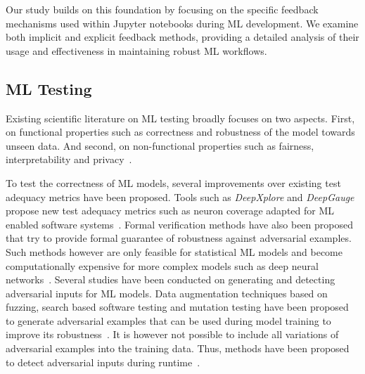 \documentclass[smallextended]{svjour3}       %
\begin{document}
Our study builds on this foundation by focusing on the specific feedback mechanisms used within Jupyter notebooks during ML development. We examine both implicit and explicit feedback methods, providing a detailed analysis of their usage and effectiveness in maintaining robust ML workflows.

\subsection{ML Testing}\label{sec:ml-testing}

Existing scientific literature on ML testing broadly focuses on two aspects. First, on functional properties such as correctness and robustness of the model towards unseen data. And second, on non-functional properties such as fairness, interpretability and privacy~\citep{zhang2022machine,mehrabi2021survey,chen2022fairness}.

To test the correctness of ML models, several improvements over existing test adequacy metrics have been proposed. Tools such as \textit{DeepXplore} and \textit{DeepGauge} propose new test adequacy metrics such as neuron coverage adapted for ML enabled software systems~\citep{pei2017deepxplore,ma2018deepgauge,gerasimou2020importance-driven}. Formal verification methods have also been proposed that try to provide formal guarantee of robustness against adversarial examples. Such methods however are only feasible for statistical ML models and become computationally expensive for more complex models such as deep neural networks~\citep{zhu2021deepmemory,baluta2021scalable}. Several studies have been conducted on generating and detecting adversarial inputs for ML models. Data augmentation techniques based on fuzzing, search based software testing and mutation testing have been proposed to generate adversarial examples that can be used during model training to improve its robustness~\citep{braiek2019deepevolution,gao2020fuzz,wang2021robot,zhang2020white-box}. It is however not possible to include all variations of adversarial examples into the training data. Thus, methods have been proposed to detect adversarial inputs during runtime~\citep{xiao2021self-checking,wang2020dissector,wang2019adversarial,berend2020cats}.
\end{document}
